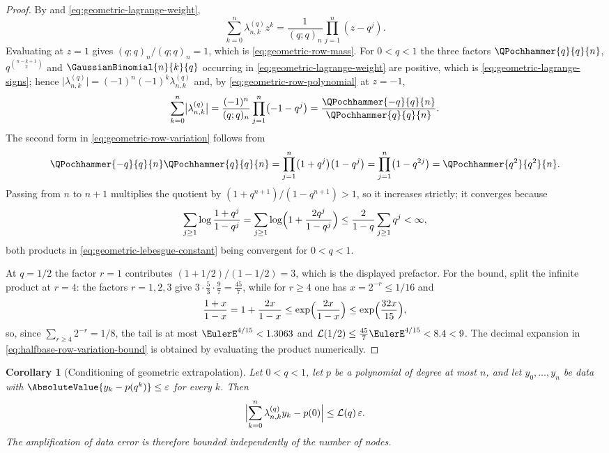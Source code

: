 \documentclass[11pt,a4paper,oneside,openany]{book}
\newtheorem{corollary}[corollary]{Corollary}
\theoremstyle{definition}
\theoremstyle{remark}
\begin{document}
\begin{proof}
By  and \eqref{eq:geometric-lagrange-weight},
\begin{equation}\label{eq:geometric-row-polynomial}
 \sum_{k=0}^{n}\lambda_{n,k}^{(q)}z^k
 =\frac1{(q;q)_n}\prod_{j=1}^{n}(z-q^j).
\end{equation}
Evaluating at $z=1$ gives $(q;q)_n/(q;q)_n=1$, which is
\eqref{eq:geometric-row-mass}.  For $0<q<1$ the three factors $\QPochhammer{q}{q}{n}$,
$q^{\binom{n-k+1}{2}}$ and $\GaussianBinomial{n}{k}{q}$ occurring in
\eqref{eq:geometric-lagrange-weight} are positive, which is
\eqref{eq:geometric-lagrange-signs}; hence
$\bigl|\lambda_{n,k}^{(q)}\bigr|=(-1)^{n}(-1)^{k}\lambda_{n,k}^{(q)}$ and, by
\eqref{eq:geometric-row-polynomial} at $z=-1$,
\[
 \sum_{k=0}^{n}\bigl|\lambda_{n,k}^{(q)}\bigr|
 =\frac{(-1)^n}{(q;q)_n}\prod_{j=1}^{n}\bigl(-1-q^j\bigr)
 =\frac{\QPochhammer{-q}{q}{n}}{\QPochhammer{q}{q}{n}} .
\]
The second form in \eqref{eq:geometric-row-variation} follows from
\[
 \QPochhammer{-q}{q}{n}\QPochhammer{q}{q}{n}
 =\prod_{j=1}^{n}\bigl(1+q^j\bigr)\bigl(1-q^j\bigr)
 =\prod_{j=1}^{n}\bigl(1-q^{2j}\bigr)=\QPochhammer{q^2}{q^2}{n}.
\]
Passing from $n$ to $n+1$ multiplies the quotient by $(1+q^{n+1})/(1-q^{n+1})>1$, so it
increases strictly; it converges because
\[
 \sum_{j\ge1}\log\frac{1+q^j}{1-q^j}
 =\sum_{j\ge1}\log\Bigl(1+\frac{2q^j}{1-q^j}\Bigr)
 \le\frac2{1-q}\sum_{j\ge1}q^j<\infty,
\]
both products in \eqref{eq:geometric-lebesgue-constant} being convergent for $0<q<1$.

At $q=1/2$ the factor $r=1$ contributes $(1+1/2)/(1-1/2)=3$, which is the displayed
prefactor.  For the bound, split the infinite product at $r=4$: the factors $r=1,2,3$ give
$3\cdot\frac53\cdot\frac97=\frac{45}7$, while for $r\ge4$ one has $x=2^{-r}\le1/16$ and
\[
 \frac{1+x}{1-x}=1+\frac{2x}{1-x}\le\exp\Bigl(\frac{2x}{1-x}\Bigr)
 \le\exp\Bigl(\frac{32x}{15}\Bigr),
\]
so, since $\sum_{r\ge4}2^{-r}=1/8$, the tail is at most $\EulerE^{4/15}<1.3063$ and
$\mathcal L(1/2)\le\frac{45}7\EulerE^{4/15}<8.4<9$.  The decimal expansion in
\eqref{eq:halfbase-row-variation-bound} is obtained by evaluating the product
numerically.
\end{proof}

\begin{corollary}[Conditioning of geometric extrapolation]\label{cor:geometric-extrapolation-conditioning}
Let $0<q<1$, let $p$ be a polynomial of degree at most $n$, and let $y_0,\ldots,y_n$ be
data with $\AbsoluteValue{y_k-p(q^k)}\le\varepsilon$ for every $k$.  Then
\begin{equation}\label{eq:geometric-extrapolation-conditioning}
 \Bigl|\sum_{k=0}^{n}\lambda^{(q)}_{n,k}y_k-p(0)\Bigr|\le\mathcal L(q)\,\varepsilon .
\end{equation}
The amplification of data error is therefore bounded independently of the number of
nodes.
\end{corollary}
\end{document}
